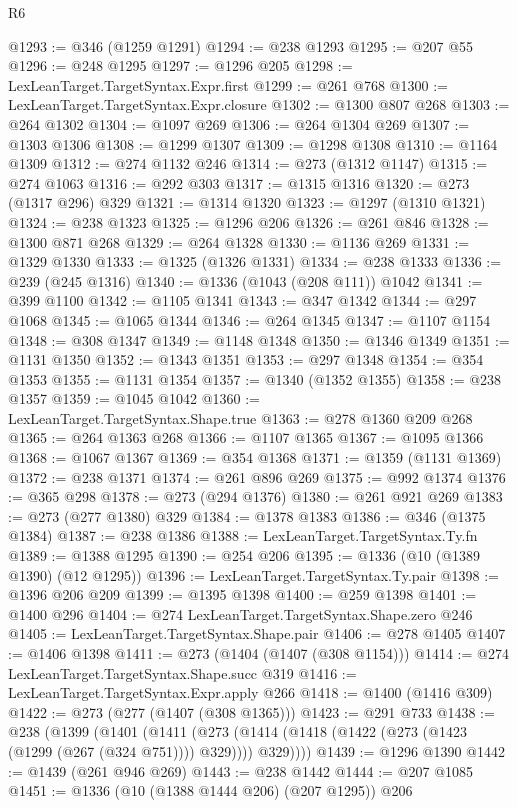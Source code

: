 \begin{lexlean}{R6}
\begin{coremodule}
{{{{{{{{{{{{{{{{{{{@1293 := @346 (@1259 @1291)
@1294 := @238 @1293
@1295 := @207 @55
@1296 := @248 @1295
@1297 := @1296 @205
@1298 := LexLeanTarget.TargetSyntax.Expr.first
@1299 := @261 @768
@1300 := LexLeanTarget.TargetSyntax.Expr.closure
@1302 := @1300 @807 @268
@1303 := @264 @1302
@1304 := @1097 @269
@1306 := @264 @1304 @269
@1307 := @1303 @1306
@1308 := @1299 @1307
@1309 := @1298 @1308
@1310 := @1164 @1309
@1312 := @274 @1132 @246
@1314 := @273 (@1312 @1147)
@1315 := @274 @1063
@1316 := @292 @303
@1317 := @1315 @1316
@1320 := @273 (@1317 @296) @329
@1321 := @1314 @1320
@1323 := @1297 (@1310 @1321)
@1324 := @238 @1323
@1325 := @1296 @206
@1326 := @261 @846
@1328 := @1300 @871 @268
@1329 := @264 @1328
@1330 := @1136 @269
@1331 := @1329 @1330
@1333 := @1325 (@1326 @1331)
@1334 := @238 @1333
@1336 := @239 (@245 @1316)
@1340 := @1336 (@1043 (@208 @111)) @1042
@1341 := @399 @1100
@1342 := @1105 @1341
@1343 := @347 @1342
@1344 := @297 @1068
@1345 := @1065 @1344
@1346 := @264 @1345
@1347 := @1107 @1154
@1348 := @308 @1347
@1349 := @1148 @1348
@1350 := @1346 @1349
@1351 := @1131 @1350
@1352 := @1343 @1351
@1353 := @297 @1348
@1354 := @354 @1353
@1355 := @1131 @1354
@1357 := @1340 (@1352 @1355)
@1358 := @238 @1357
@1359 := @1045 @1042
@1360 := LexLeanTarget.TargetSyntax.Shape.true
@1363 := @278 @1360 @209 @268
@1365 := @264 @1363 @268
@1366 := @1107 @1365
@1367 := @1095 @1366
@1368 := @1067 @1367
@1369 := @354 @1368
@1371 := @1359 (@1131 @1369)
@1372 := @238 @1371
@1374 := @261 @896 @269
@1375 := @992 @1374
@1376 := @365 @298
@1378 := @273 (@294 @1376)
@1380 := @261 @921 @269
@1383 := @273 (@277 @1380) @329
@1384 := @1378 @1383
@1386 := @346 (@1375 @1384)
@1387 := @238 @1386
@1388 := LexLeanTarget.TargetSyntax.Ty.fn
@1389 := @1388 @1295
@1390 := @254 @206
@1395 := @1336 (@10 (@1389 @1390) (@12 @1295))
@1396 := LexLeanTarget.TargetSyntax.Ty.pair
@1398 := @1396 @206 @209
@1399 := @1395 @1398
@1400 := @259 @1398
@1401 := @1400 @296
@1404 := @274 LexLeanTarget.TargetSyntax.Shape.zero @246
@1405 := LexLeanTarget.TargetSyntax.Shape.pair
@1406 := @278 @1405
@1407 := @1406 @1398
@1411 := @273 (@1404 (@1407 (@308 @1154)))
@1414 := @274 LexLeanTarget.TargetSyntax.Shape.succ @319
@1416 := LexLeanTarget.TargetSyntax.Expr.apply @266
@1418 := @1400 (@1416 @309)
@1422 := @273 (@277 (@1407 (@308 @1365)))
@1423 := @291 @733
@1438 := @238
    (@1399
      (@1401
        (@1411 (@273 (@1414 (@1418 (@1422 (@273 (@1423 (@1299 (@267 (@324 @751)))) @329)))) @329))))
@1439 := @1296 @1390
@1442 := @1439 (@261 @946 @269)
@1443 := @238 @1442
@1444 := @207 @1085
@1451 := @1336 (@10 (@1388 @1444 @206) (@207 @1295)) @206
}}}}}}}}}}}}}}}}}}}
\end{coremodule}
\end{lexlean}
